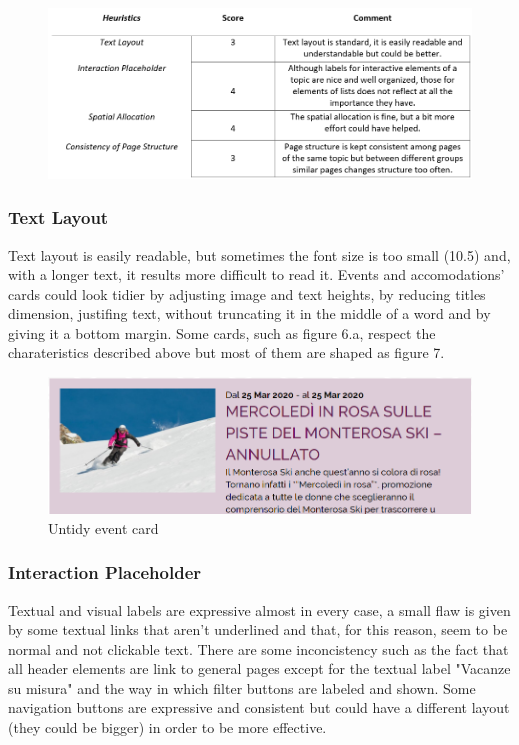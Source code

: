 \begin{figure}[h!]
	\centering
	\begin{minipage}[b]{1\textwidth}
    		\includegraphics[width=\textwidth]{./assets/layout-final.PNG}
	\end{minipage}
\end{figure}
\FloatBarrier

\subsubsection{Text Layout}
Text layout is easily readable, but sometimes the font size is too small (10.5) and, with a longer text, it results more difficult to read it. Events and accomodations' cards could look tidier by adjusting image and text heights, by reducing titles dimension, justifing text, without truncating it in the middle of a word and by giving it a bottom margin. Some cards, such as figure 6.a, respect the charateristics described above but most of them are shaped as figure 7.

\begin{figure}[h!]
	\centering
	\begin{minipage}[b]{1\textwidth}
    		\includegraphics[width=\textwidth]{./assets/event.png}
		\caption{Untidy event card}
	\end{minipage}
\end{figure}
\FloatBarrier

\subsubsection{Interaction Placeholder}
Textual and visual labels are expressive almost in every case, a small flaw is given by some textual links that aren't underlined and that, for this reason, seem to be normal and not clickable text. There are some inconcistency such as the fact that all header elements are link to general pages except for the textual label "Vacanze su misura" and the way in which filter buttons are labeled and shown. Some navigation buttons are expressive and consistent but could have a different layout (they could be bigger) in order to be more effective.

